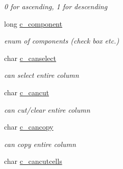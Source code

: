 \begin{DoxyCompactItemize}
\begin{DoxyCompactList}\small\item\em 0 for ascending, 1 for descending \item\end{DoxyCompactList}\item 
\hypertarget{structt__jcolumn_a51c89994c0cee88ace88d3d19fc53f30}{
long \hyperlink{structt__jcolumn_a51c89994c0cee88ace88d3d19fc53f30}{c\_\-component}}
\label{structt__jcolumn_a51c89994c0cee88ace88d3d19fc53f30}

\begin{DoxyCompactList}\small\item\em enum of components (check box etc.) \item\end{DoxyCompactList}\item 
\hypertarget{structt__jcolumn_afe3c7e40037d074ad38ff9baea76255e}{
char \hyperlink{structt__jcolumn_afe3c7e40037d074ad38ff9baea76255e}{c\_\-canselect}}
\label{structt__jcolumn_afe3c7e40037d074ad38ff9baea76255e}

\begin{DoxyCompactList}\small\item\em can select entire column \item\end{DoxyCompactList}\item 
\hypertarget{structt__jcolumn_a10774ec464f9ce6f732466bcf87fbd97}{
char \hyperlink{structt__jcolumn_a10774ec464f9ce6f732466bcf87fbd97}{c\_\-cancut}}
\label{structt__jcolumn_a10774ec464f9ce6f732466bcf87fbd97}

\begin{DoxyCompactList}\small\item\em can cut/clear entire column \item\end{DoxyCompactList}\item 
\hypertarget{structt__jcolumn_ab4b97528a23381b6fb2831eb82f031dc}{
char \hyperlink{structt__jcolumn_ab4b97528a23381b6fb2831eb82f031dc}{c\_\-cancopy}}
\label{structt__jcolumn_ab4b97528a23381b6fb2831eb82f031dc}

\begin{DoxyCompactList}\small\item\em can copy entire column \item\end{DoxyCompactList}\item 
\hypertarget{structt__jcolumn_aab10aed9c6612bcc70a87bd01fc449ec}{
char \hyperlink{structt__jcolumn_aab10aed9c6612bcc70a87bd01fc449ec}{c\_\-cancutcells}}
\label{structt__jcolumn_aab10aed9c6612bcc70a87bd01fc449ec}


\end{DoxyCompactItemize}
